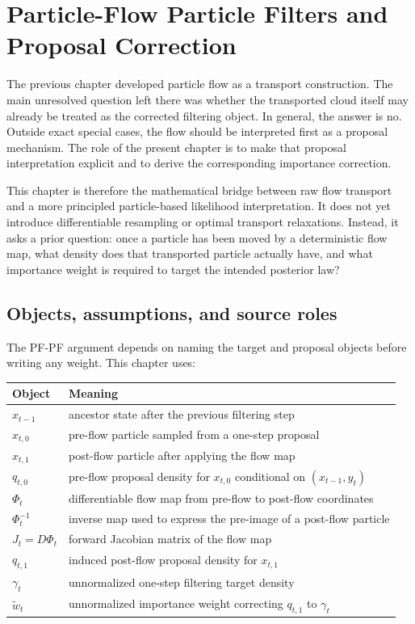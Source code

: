 \chapter{Particle-Flow Particle Filters and Proposal Correction}
\label{ch:bf-dpf-pfpf}

The previous chapter developed particle flow as a transport construction.  The
main unresolved question left there was whether the transported cloud itself may
already be treated as the corrected filtering object.  In general, the answer is
no.  Outside exact special cases, the flow should be interpreted first as a
proposal mechanism.  The role of the present chapter is to make that proposal
interpretation explicit and to derive the corresponding importance correction.

This chapter is therefore the mathematical bridge between raw flow transport and
a more principled particle-based likelihood interpretation.  It does not yet
introduce differentiable resampling or optimal transport relaxations.  Instead,
it asks a prior question: once a particle has been moved by a deterministic flow
map, what density does that transported particle actually have, and what
importance weight is required to target the intended posterior law?

\section{Objects, assumptions, and source roles}
\label{sec:bf-pfpf-objects}

The PF-PF argument depends on naming the target and proposal objects before
writing any weight.  This chapter uses:

\begin{center}
\small
\begin{tabular}{p{} p{}}
\toprule
Object & Meaning \\
\midrule
$x_{t-1}$ & ancestor state after the previous filtering step \\
$x_{t,0}$ & pre-flow particle sampled from a one-step proposal \\
$x_{t,1}$ & post-flow particle after applying the flow map \\
$q_{t,0}$ & pre-flow proposal density for $x_{t,0}$ conditional on
$(x_{t-1},y_t)$ \\
$\Phi_t$ & differentiable flow map from pre-flow to post-flow coordinates \\
$\Phi_t^{-1}$ & inverse map used to express the pre-image of a post-flow
particle \\
$J_t=D\Phi_t$ & forward Jacobian matrix of the flow map \\
$q_{t,1}$ & induced post-flow proposal density for $x_{t,1}$ \\
$\gamma_t$ & unnormalized one-step filtering target density \\
$\tilde w_t$ & unnormalized importance weight correcting $q_{t,1}$ to
$\gamma_t$ \\
\bottomrule
\end{tabular}
\end{center}

